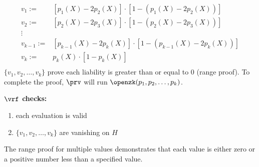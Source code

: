 \begin{Protocol*}[t!]
\begin{mdframed}
\begin{enumerate}
    \begin{align*}
        v_1:=&[p_1(X)-2p_2(X)]\cdot[1-(p_1(X)-2p_2(X))] \\
        v_2:=&[p_2(X)-2p_3(X)]\cdot[1-(p_2(X)-2p_3(X))] \\
        \vdots \\
        v_{k-1}:=&[p_{k-1}(X)-2p_k(X)]\cdot[1-(p_{k-1}(X)-2p_k(X))] \\
        v_k:=&p_k(X)\cdot[1-p_k(X)] \\
    \end{align*}
    $\{v_1,v_2,\dots,v_k\}$ prove each liability is greater than or equal to 0 (range proof). To complete the proof, $\prv$ will run $\openzk(p_1,p_2,\dots,p_k)$.
\end{enumerate}

\textbf{$\vrf$ checks:}
\begin{enumerate}
    \item each evaluation is valid
    \item $\{v_1,v_2,\dots,v_k\}$ are vanishing on $H$
\end{enumerate}


\normalsize	
\end{mdframed}
\caption{The range proof for multiple values demonstrates that each value is either zero or a positive number less than a specified value. \label{alg:multirange}}
\end{Protocol*}
